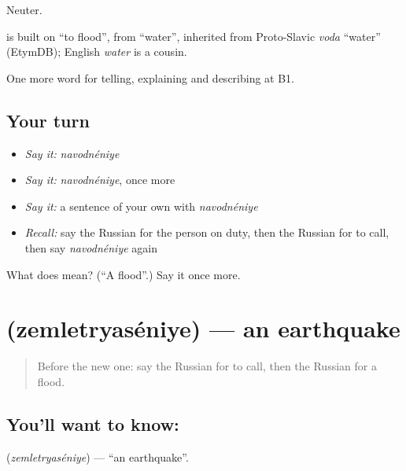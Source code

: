 Neuter.

\begin{cousinweb}
\emph{} is built on \emph{} \textquotedblleft{}to flood\textquotedblright{}, from \emph{} \textquotedblleft{}water\textquotedblright{}, inherited from Proto-Slavic \emph{voda} \textquotedblleft{}water\textquotedblright{} (EtymDB); English \emph{water} is a cousin.
\end{cousinweb}

\begin{grammarlens}[title={What you've built}]
One more word for telling, explaining and describing at B1.
\end{grammarlens}

\subsection*{Your turn}
\begin{itemize}
\raggedright
  \item \emph{Say it:} \emph{navodnéniye}
  \item \emph{Say it:} \emph{navodnéniye}, once more
  \item \emph{Say it:} a sentence of your own with \emph{navodnéniye}
  \item \emph{Recall:} say the Russian for the person on duty, then the Russian for to call, then say \emph{navodnéniye} again
\end{itemize}

\begin{tcolorbox}[breakable,colback=teal!4,colframe=teal!35!black,title={Before you move on}]
What does  mean? (\textquotedblleft{}A flood\textquotedblright{}.) Say it once more.
\end{tcolorbox}
\section[\texorpdfstring{\ru{землетрясение} (zemletryaséniye)}{землетрясение (zemletryaséniye)}]{ (zemletryaséniye) — an earthquake}

\label{lesson:RU-C300-zemletryaseniye}



\begin{quote}
Before the new one: say the Russian for to call, then the Russian for a flood.
\end{quote}

\subsection*{You'll want to know: }
\textbf{} (\emph{zemletryaséniye}) — \textquotedblleft{}an earthquake\textquotedblright{}.

